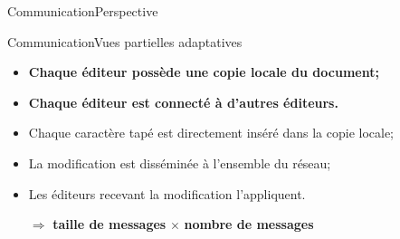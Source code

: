 \begin{frame}{Communication}{Perspective}
\begin{minipage}{0.325\textwidth}
  \end{minipage}

\end{frame}


\begin{frame}{Communication}{Vues partielles adaptatives}

  \hspace{-1cm}
  \begin{minipage}{0.55\textwidth}
    \begin{itemize}
      \item \textbf{Chaque éditeur possède une copie locale du document;}
      \item \textbf{Chaque éditeur est connecté à d'autres éditeurs.}
      \vspace{0.5cm}
    \item Chaque caractère tapé est directement inséré dans la copie locale;
    \item La modification est disséminée à l'ensemble du réseau;
    \item Les éditeurs recevant la modification l'appliquent.
    \end{itemize}
  \end{minipage}
  \hfill
  \begin{minipage}{0.44\textwidth}
    \begin{center}
      
    \end{center}
  \end{minipage}

  
  \vspace{1cm}
  \large
  \begin{itemize}
  \item [$\Rightarrow$] \textbf{taille de messages} $\times$ \textbf{nombre de messages}
  \end{itemize}



\end{frame}



